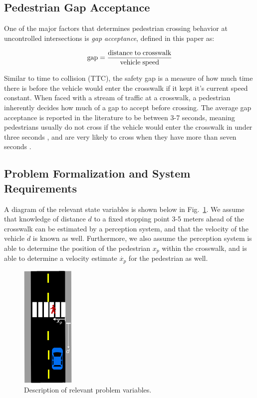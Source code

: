 \documentclass[letterpaper, 10 pt, conference]{ieeeconf}  %
\begin{document}
\subsection{Pedestrian Gap Acceptance}

One of the major factors that determines pedestrian crossing behavior at uncontrolled intersections is \textit{gap acceptance}, defined in this paper as:

\begin{equation}
\mathrm{gap} = \frac{\mathrm{distance\hspace{1mm}to\hspace{1mm}crosswalk}}{\mathrm{vehicle\hspace{1mm}speed}}
\end{equation} 

Similar to time to collision (TTC), the safety gap is a measure of how much time there is before the vehicle would enter the crosswalk if it kept it's current speed constant. When faced with a stream of traffic at a crosswalk, a pedestrian inherently decides how much of a gap to accept before crossing. The average gap acceptance is reported in the literature to be between 3-7 seconds, meaning pedestrians usually do not cross if the vehicle would enter the crosswalk in under three seconds \cite{DiPietroCharlesMandKing1970}, and are very likely to cross when they have more than seven seconds \cite{Schmidt2009}. 

\subsection{Problem Formalization and System Requirements}
\label{sec:probform}

A diagram of the relevant state variables is shown below in Fig.~\ref{fig:diagram1}. We assume that knowledge of distance $d$ to a fixed stopping point 3-5 meters ahead of the crosswalk can be estimated by a perception system, and that the velocity of the vehicle $\dot{d}$ is known as well. Furthermore, we also assume the perception system is able to determine the position of the pedestrian $x_p$ within the crosswalk, and is able to determine a velocity estimate $\dot{x_p}$ for the pedestrian as well. 

\begin{figure}
\centering
\includegraphics[width=1in]{figures/diagram.eps}
\caption{Description of relevant problem variables.}
\label{fig:diagram1}
\end{figure}
\end{document}
